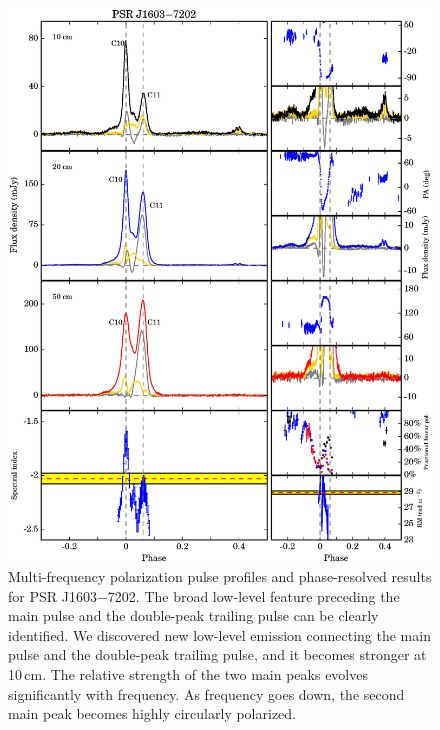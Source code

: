 \documentclass[useAMS,usenatbib]{mn2e}
\begin{document}
\begin{appendix}
\begin{figure}
\begin{center}
\includegraphics[width=6 in]{1603.ps}
\caption{Multi-frequency polarization pulse profiles and phase-resolved results for PSR J1603$-$7202. 
The broad low-level feature preceding the main pulse and the double-peak trailing 
pulse can be clearly identified.
%
We discovered new low-level emission connecting the main pulse and the 
double-peak trailing pulse, and it becomes stronger at 10\,cm.
%
The relative strength of the two main peaks evolves significantly with frequency.
%
As frequency goes down, the second main peak becomes highly circularly polarized.
}
\label{1603}
\end{center}
\end{figure}


\end{appendix}
\end{document}
